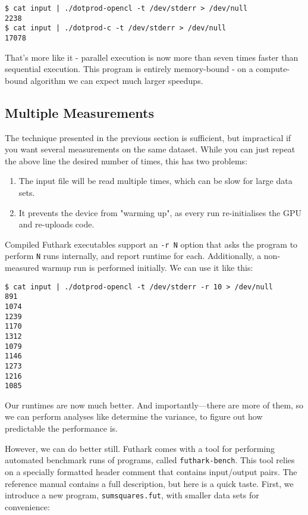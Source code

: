 \documentclass[oneside,11pt]{book}
\begin{document}
\begin{verbatim}
$ cat input | ./dotprod-opencl -t /dev/stderr > /dev/null
2238
$ cat input | ./dotprod-c -t /dev/stderr > /dev/null
17078
\end{verbatim}

That's more like it - parallel execution is now more than seven times
faster than sequential execution.  This program is entirely
memory-bound - on a compute-bound algorithm we can expect much larger
speedups.

\subsection{Multiple Measurements}

The technique presented in the previous section is sufficient, but
impractical if you want several measurements on the same dataset.
While you can just repeat the above line the desired number of times,
this has two problems:

\begin{enumerate}
\item The input file will be read multiple times, which can be slow
  for large data sets.
\item It prevents the device from "warming up", as every run
  re-initialises the GPU and re-uploads code.
\end{enumerate}

Compiled Futhark executables support an \texttt{-r N} option that asks
the program to perform \texttt{N} runs internally, and report runtime
for each.  Additionally, a non-measured warmup run is performed
initially.  We can use it like this:

\begin{verbatim}
$ cat input | ./dotprod-opencl -t /dev/stderr -r 10 > /dev/null
891
1074
1239
1170
1312
1079
1146
1273
1216
1085
\end{verbatim}

Our runtimes are now much better.  And importantly---there are
more of them, so we can perform analyses like determine the variance,
to figure out how predictable the performance is.

However, we can do better still.  Futhark comes with a tool for
performing automated benchmark runs of programs, called
\texttt{futhark-bench}.  This tool relies on a specially formatted
header comment that contains input/output pairs.  The reference manual
contains a full description, but here is a quick taste.  First, we
introduce a new program, \texttt{sumsquares.fut}, with smaller data
sets for convenience:
\end{document}
